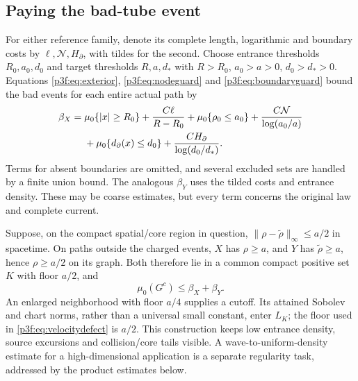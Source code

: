 \documentclass[11pt]{article}
\numberwithin{equation}{section}
\theoremstyle{definition}
\theoremstyle{remark}
\begin{document}
\subsection{Paying the bad-tube event}

For either reference family, denote its complete length,
logarithmic and boundary costs by $\ell,\mathcal N,H_\partial$,
with tildes for the second. Choose entrance thresholds
$R_0,a_0,d_0$ and target thresholds $R,a,d_*$ with
$R>R_0$, $a_0>a>0$, $d_0>d_*>0$.
Equations \eqref{p3f:eq:exterior},
\eqref{p3f:eq:nodeguard} and \eqref{p3f:eq:boundaryguard} bound the
bad events for each entire actual path by
\begin{align}
 \beta_X={}&\mu_0\{|x|\geq R_0\}+\frac{C\ell}{R-R_0}
   +\mu_0\{\rho_0\leq a_0\}
                       +\frac{C\mathcal N}{\log(a_0/a)}
   \notag\\
 &+\mu_0\{d_\partial(x)\leq d_0\}
                       +\frac{CH_\partial}{\log(d_0/d_*)}.
 \label{p3f:eq:badcharge}
\end{align}
Terms for absent boundaries are omitted, and several excluded
sets are handled by a finite union bound. The analogous
$\beta_Y$ uses the tilded costs and entrance density. These
may be coarse estimates, but every term concerns the original
law and complete current.

Suppose, on the compact spatial/core region in question,
$\|\rho-\widetilde\rho\|_\infty\leq a/2$ in spacetime.
On paths outside the charged events, $X$ has $\rho\geq a$,
and $Y$ has $\widetilde\rho\geq a$, hence $\rho\geq a/2$ on
its graph. Both therefore lie in a common compact positive set
$K$ with floor $a/2$, and
\begin{equation}\label{p3f:eq:Gcharge}
 \mu_0(G^c)\leq\beta_X+\beta_Y.
\end{equation}
An enlarged neighborhood with floor $a/4$ supplies a cutoff.
Its attained Sobolev and chart norms, rather than a universal
small constant, enter $L_K$; the floor used in
\eqref{p3f:eq:velocitydefect} is $a/2$.
This construction keeps low entrance density, source excursions
and collision/core tails visible. A wave-to-uniform-density
estimate for a high-dimensional application is a separate
regularity task, addressed by the product estimates below.
\end{document}
